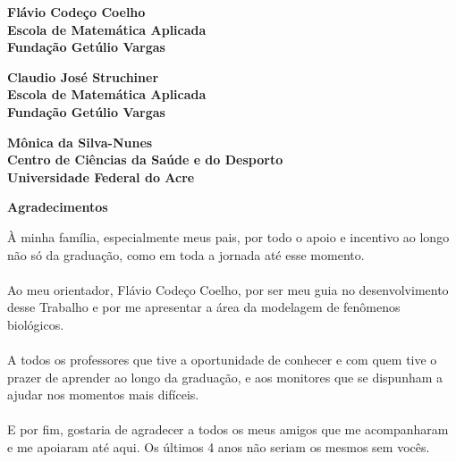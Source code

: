 \documentclass[12pt]{article}
\begin{document}
\par
\vspace{40pt}
\begin{center}

\hrulefill

\vspace{5pt}
\textbf{Flávio Codeço Coelho}\\
\textbf{Escola de Matemática Aplicada}\\
\textbf{Fundação Getúlio Vargas}

\vspace{30pt}

\hrulefill

\vspace{5pt}
\textbf{Claudio José Struchiner}\\
\textbf{Escola de Matemática Aplicada}\\
\textbf{Fundação Getúlio Vargas}

\vspace{30pt}

\hrulefill

\vspace{5pt}
\textbf{Mônica da Silva-Nunes}\\
\textbf{Centro de Ciências da Saúde e do Desporto}\\
\textbf{Universidade Federal do Acre}
\end{center}

\thispagestyle{empty}

\newpage
\begin{center}
        \textbf{Agradecimentos}
\end{center}
À minha família, especialmente meus pais, por todo o apoio e 
incentivo ao longo não só da graduação, como em toda a jornada até esse momento. 
\\\\
Ao meu orientador, Flávio Codeço Coelho, por ser meu guia no
desenvolvimento desse Trabalho e por me apresentar a área da modelagem de fenômenos biológicos.   
\\\\
A todos os professores que tive a oportunidade de conhecer e com quem tive o prazer de aprender 
ao longo da graduação, e aos monitores que se dispunham a ajudar nos momentos mais difíceis.
\\\\
E por fim, gostaria de agradecer a todos os meus amigos que me acompanharam e me apoiaram até aqui. 
Os últimos 4 anos não seriam os mesmos sem vocês.
\end{document}
